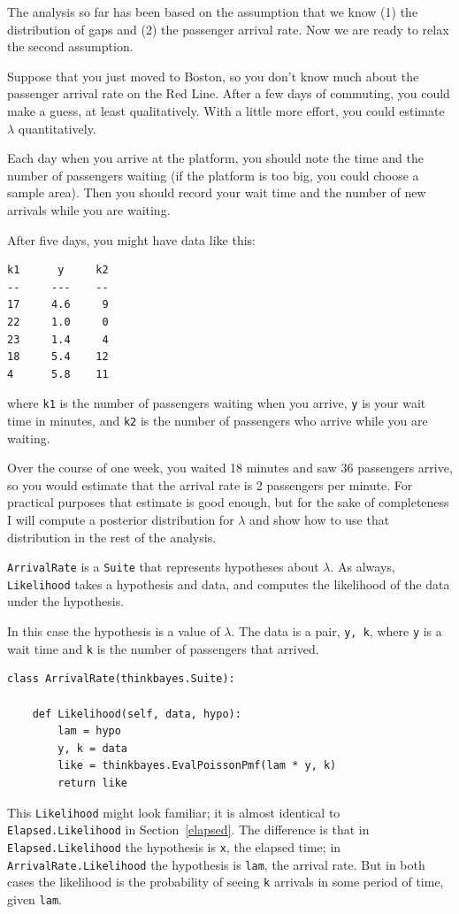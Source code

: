 \documentclass[12pt]{book}
\begin{document}
The analysis so far has been based on the assumption that we know (1)
the distribution of gaps and (2) the passenger arrival rate.  Now we
are ready to relax the second assumption.

Suppose that you just moved to Boston, so you don't know much about
the passenger arrival rate on the Red Line.  After a few days of
commuting, you could make a guess, at least qualitatively.  With
a little more effort, you could estimate $\lambda$ quantitatively.

Each day when you arrive at the platform, you should note the
time and the number of passengers waiting (if the platform is too
big, you could choose a sample area).  Then you should record your
wait time and the
number of new arrivals while you are waiting.

After five days, you might have data like this:
%
\begin{verbatim}
k1      y     k2
--     ---    --
17     4.6     9
22     1.0     0
23     1.4     4
18     5.4    12
4      5.8    11
\end{verbatim}
%
where {\tt k1} is the number of passengers waiting when you arrive,
{\tt y} is your wait time in minutes, and {\tt k2} is the number of
passengers who arrive while you are waiting.

Over the course of one week, you waited 18 minutes and saw 36
passengers arrive, so you would estimate that the arrival rate is
2 passengers per minute.  For practical purposes that estimate is
good enough, but for the sake of completeness I
will compute a posterior distribution for $\lambda$ and show how
to use that distribution in the rest of the analysis.

{\tt ArrivalRate} is a {\tt Suite} that represents hypotheses about
$\lambda$.  As always, {\tt Likelihood} takes a hypothesis and data,
and computes the likelihood of the data under the hypothesis.

In this case the hypothesis is a value of $\lambda$.  The data is a
pair, {\tt y, k}, where {\tt y} is a wait time and {\tt k} is the
number of passengers that arrived.

\begin{verbatim}
class ArrivalRate(thinkbayes.Suite):

    def Likelihood(self, data, hypo):
        lam = hypo
        y, k = data
        like = thinkbayes.EvalPoissonPmf(lam * y, k)
        return like
\end{verbatim}

This {\tt Likelihood} might look familiar; it
is almost identical to {\tt Elapsed.Likelihood} in
Section~\ref{elapsed}.  The difference is that in {\tt
  Elapsed.Likelihood} the hypothesis is {\tt x}, the elapsed time; in
{\tt ArrivalRate.Likelihood} the hypothesis is {\tt lam}, the arrival
rate.  But in both cases the likelihood is the probability of seeing
{\tt k} arrivals in some period of time, given {\tt lam}.
\end{document}
